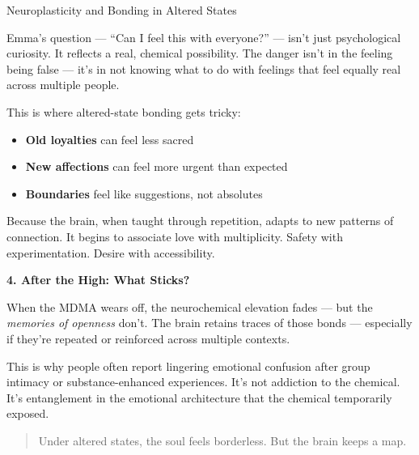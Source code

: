 \begin{TechnicalSidebar}{Neuroplasticity and Bonding in Altered States}
  \medskip
  
  
  Emma’s question — “Can I feel this with everyone?” — isn’t just psychological curiosity.
  It reflects a real, chemical possibility.
  The danger isn’t in the feeling being false — it’s in not knowing what to do with feelings 
  that feel equally 
  real across multiple people.

  \medskip
  
  
  This is where altered-state bonding gets tricky:

  \medskip
  
  
  \begin{itemize}
    \item \textbf{Old loyalties} can feel less sacred
    \item \textbf{New affections} can feel more urgent than expected
    \item \textbf{Boundaries} feel like suggestions, not absolutes
  \end{itemize}

  \medskip
  
  
  Because the brain, when taught through repetition, adapts to new patterns of connection.
  It begins to associate love with multiplicity.
  Safety with experimentation.
  Desire with accessibility.
  
  \medskip
  

  \textbf{4. After the High: What Sticks?}

  \medskip
  
  
  When the MDMA wears off, the neurochemical elevation fades — but the \textit{memories 
  of openness} don’t.
  The brain retains traces of those bonds — especially if they’re repeated or reinforced 
  across multiple contexts.

  \medskip
  
  
  This is why people often report lingering emotional confusion after group intimacy or 
  substance-enhanced 
  experiences. It’s not addiction to the chemical.
  It’s entanglement in the emotional architecture that the chemical temporarily exposed.
  
  \medskip
  
  \begin{quote}
  Under altered states, the soul feels borderless.
  But the brain keeps a map.
  \end{quote}

\end{TechnicalSidebar}